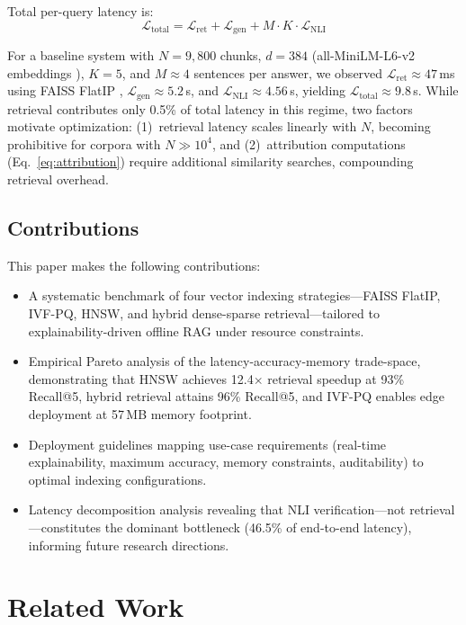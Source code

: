 \documentclass[conference]{IEEEtran}
\begin{document}
Total per-query latency is:
\begin{equation}
\mathcal{L}_{\mathrm{total}} = \mathcal{L}_{\mathrm{ret}} + \mathcal{L}_{\mathrm{gen}} + M \cdot K \cdot \mathcal{L}_{\mathrm{NLI}}
\label{eq:total_latency}
\end{equation}

For a baseline system with $N{=}9{,}800$ chunks, $d{=}384$ (all-MiniLM-L6-v2 embeddings \cite{reimers2019sbert}), $K{=}5$, and $M{\approx}4$ sentences per answer, we observed $\mathcal{L}_{\mathrm{ret}} \approx 47$\,ms using FAISS FlatIP \cite{johnson2019faiss}, $\mathcal{L}_{\mathrm{gen}} \approx 5.2$\,s, and $\mathcal{L}_{\mathrm{NLI}} \approx 4.56$\,s, yielding $\mathcal{L}_{\mathrm{total}} \approx 9.8$\,s. While retrieval contributes only 0.5\% of total latency in this regime, two factors motivate optimization: (1)~retrieval latency scales linearly with $N$, becoming prohibitive for corpora with $N \gg 10^4$, and (2)~attribution computations (Eq.~\ref{eq:attribution}) require additional similarity searches, compounding retrieval overhead.

\subsection{Contributions}

This paper makes the following contributions:
\begin{itemize}
    \item A systematic benchmark of four vector indexing strategies—FAISS FlatIP, IVF-PQ, HNSW, and hybrid dense-sparse retrieval—tailored to explainability-driven offline RAG under resource constraints.
    \item Empirical Pareto analysis of the latency-accuracy-memory trade-space, demonstrating that HNSW achieves 12.4$\times$ retrieval speedup at 93\% Recall@5, hybrid retrieval attains 96\% Recall@5, and IVF-PQ enables edge deployment at 57\,MB memory footprint.
    \item Deployment guidelines mapping use-case requirements (real-time explainability, maximum accuracy, memory constraints, auditability) to optimal indexing configurations.
    \item Latency decomposition analysis revealing that NLI verification—not retrieval—constitutes the dominant bottleneck (46.5\% of end-to-end latency), informing future research directions.
\end{itemize}

\section{Related Work}
\end{document}
